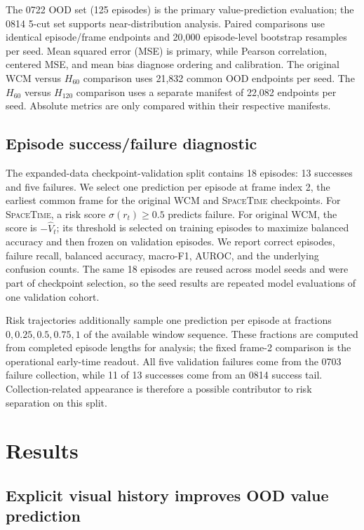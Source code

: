 \documentclass[10pt,a4paper]{article}
\newcommand{\SpaceTime}{\textsc{SpaceTime}}
\begin{document}
The 0722 OOD set (125 episodes) is the primary value-prediction evaluation; the 0814 5-cut set supports near-distribution analysis. Paired comparisons use identical episode/frame endpoints and 20,000 episode-level bootstrap resamples per seed. Mean squared error (MSE) is primary, while Pearson correlation, centered MSE, and mean bias diagnose ordering and calibration. The original WCM versus $H_{60}$ comparison uses 21,832 common OOD endpoints per seed. The $H_{60}$ versus $H_{120}$ comparison uses a separate manifest of 22,082 endpoints per seed. Absolute metrics are only compared within their respective manifests.

\subsection{Episode success/failure diagnostic}

The expanded-data checkpoint-validation split contains 18 episodes: 13 successes and five failures. We select one prediction per episode at frame index 2, the earliest common frame for the original WCM and \SpaceTime{} checkpoints. For \SpaceTime{}, a risk score $\sigma(r_t)\geq0.5$ predicts failure. For original WCM, the score is $-\hat V_t$; its threshold is selected on training episodes to maximize balanced accuracy and then frozen on validation episodes. We report correct episodes, failure recall, balanced accuracy, macro-F1, AUROC, and the underlying confusion counts. The same 18 episodes are reused across model seeds and were part of checkpoint selection, so the seed results are repeated model evaluations of one validation cohort.

Risk trajectories additionally sample one prediction per episode at fractions $0,0.25,0.5,0.75,1$ of the available window sequence. These fractions are computed from completed episode lengths for analysis; the fixed frame-2 comparison is the operational early-time readout. All five validation failures come from the 0703 failure collection, while 11 of 13 successes come from an 0814 success tail. Collection-related appearance is therefore a possible contributor to risk separation on this split.

\section{Results}

\subsection{Explicit visual history improves OOD value prediction}
\end{document}
